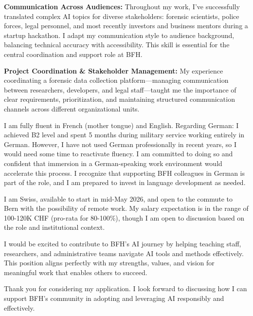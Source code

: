 \documentclass[11pt, a4paper]{awesome-cv}
\begin{document}
\begin{cvletter}
\textbf{Communication Across Audiences:} Throughout my work, I've successfully translated complex AI topics for diverse stakeholders: forensic scientists, police forces, legal personnel, and most recently investors and business mentors during a startup hackathon. I adapt my communication style to audience background, balancing technical accuracy with accessibility. This skill is essential for the central coordination and support role at BFH.

\textbf{Project Coordination \& Stakeholder Management:} My experience coordinating a forensic data collection platform—managing communication between researchers, developers, and legal staff—taught me the importance of clear requirements, prioritization, and maintaining structured communication channels across different organizational units.

I am fully fluent in French (mother tongue) and English. Regarding German: I achieved B2 level and spent 5 months during military service working entirely in German. However, I have not used German professionally in recent years, so I would need some time to reactivate fluency. I am committed to doing so and confident that immersion in a German-speaking work environment would accelerate this process. I recognize that supporting BFH colleagues in German is part of the role, and I am prepared to invest in language development as needed.

I am Swiss, available to start in mid-May 2026, and open to the commute to Bern with the possibility of remote work. My salary expectation is in the range of 100-120K CHF (pro-rata for 80-100\%), though I am open to discussion based on the role and institutional context.

I would be excited to contribute to BFH's AI journey by helping teaching staff, researchers, and administrative teams navigate AI tools and methods effectively. This position aligns perfectly with my strengths, values, and vision for meaningful work that enables others to succeed.

Thank you for considering my application. I look forward to discussing how I can support BFH's community in adopting and leveraging AI responsibly and effectively.

\end{cvletter}


\makeletterclosing
\end{document}
